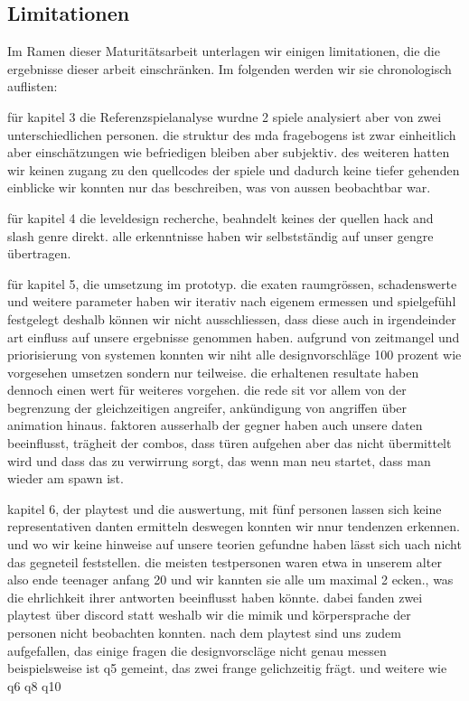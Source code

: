 \documentclass[../Main.tex]{subfiles}
\begin{document}
\subsection{Limitationen} \label{sec:Limitationen}

Im Ramen dieser Maturitätsarbeit unterlagen wir einigen limitationen, die die ergebnisse dieser arbeit einschränken. Im folgenden werden wir sie chronologisch auflisten:

für kapitel 3 die Referenzspielanalyse wurdne 2 spiele analysiert aber von zwei unterschiedlichen personen. die struktur des mda fragebogens ist zwar einheitlich aber einschätzungen wie befriedigen bleiben aber subjektiv. des weiteren hatten wir keinen zugang zu den quellcodes der spiele und dadurch keine tiefer gehenden einblicke wir konnten nur das beschreiben, was von aussen beobachtbar war.

für kapitel 4 die leveldesign recherche, beahndelt keines der quellen hack and slash genre direkt. alle erkenntnisse haben wir selbstständig auf unser gengre übertragen.

für kapitel 5, die umsetzung im prototyp. die exaten raumgrössen, schadenswerte und weitere parameter haben wir iterativ nach eigenem ermessen und spielgefühl festgelegt deshalb können wir nicht ausschliessen, dass diese auch in irgendeinder art einfluss auf unsere ergebnisse genommen haben. aufgrund von zeitmangel und priorisierung von systemen konnten wir niht alle designvorschläge 100 prozent wie vorgesehen umsetzen sondern nur teilweise. die erhaltenen resultate haben dennoch einen wert für weiteres vorgehen. die rede sit vor allem von der begrenzung der gleichzeitigen angreifer, ankündigung von angriffen über animation hinaus. faktoren ausserhalb der gegner haben auch unsere daten beeinflusst, trägheit der combos, dass türen aufgehen aber das nicht übermittelt wird und dass das zu verwirrung sorgt, das wenn man neu startet, dass man wieder am spawn ist.

kapitel 6, der playtest und die auswertung, mit fünf personen lassen sich keine representativen danten ermitteln deswegen konnten wir nnur tendenzen erkennen. und wo wir keine hinweise auf unsere teorien gefundne haben lässt sich uach nicht das gegneteil feststellen. die meisten testpersonen waren etwa in unserem alter also ende teenager anfang 20 und wir kannten sie alle um maximal 2 ecken., was die ehrlichkeit ihrer antworten beeinflusst haben könnte. dabei fanden zwei playtest über discord statt weshalb wir die mimik und körpersprache der personen nicht beobachten konnten. nach dem playtest sind uns zudem aufgefallen, das einige fragen die designvorscläge nicht genau messen beispielsweise ist q5 gemeint, das zwei frange gelichzeitig frägt. und weitere wie q6 q8 q10
\end{document}
